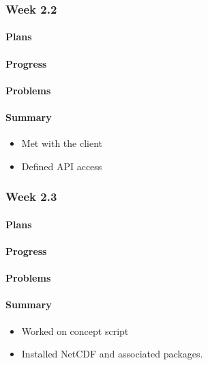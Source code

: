 \documentclass[onecolumn, draftclsnofoot,10pt, compsoc]{article}
\begin{document}
		\subsubsection{Week 2.2}
			\paragraph{Plans}

			\paragraph{Progress} \hfill \break

			\paragraph{Problems} \hfill \break

			\paragraph{Summary}\hfill \break
			    \begin{itemize}
                    \item Met with the client
                    \item Defined API access
                \end{itemize}

		\subsubsection{Week 2.3}
			\paragraph{Plans} \hfill \break

			\paragraph{Progress} \hfill \break

			\paragraph{Problems} \hfill \break

			\paragraph{Summary} \hfill \break
				\begin{itemize}
                    \item Worked on concept script
                    \item Installed NetCDF and associated packages.
                \end{itemize}
\end{document}
